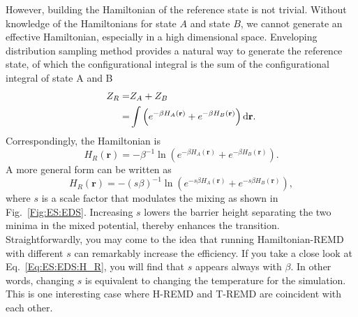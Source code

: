 However, building the Hamiltonian of the reference state is not trivial. Without knowledge of the Hamiltonians for state $A$ and state $B$, we cannot generate an effective Hamiltonian,
especially in a high dimensional space. Enveloping distribution sampling method provides a natural way to generate the reference state, of which the configurational integral is the sum of the configurational integral of state A and B
\begin{align}
	Z_R=&Z_A+Z_B\notag\\
	   =&\int \left(e^{-\beta H_A(\mathbf{r})}+e^{-\beta H_B(\mathbf{r})}\right) \mathop{}\!\mathrm{d} \mathbf{r}.
\end{align}
Correspondingly, the Hamiltonian is
\begin{equation}
	H_R(\mathbf{r})=-\beta^{-1}\ln{\left(e^{-\beta H_A(\mathbf{r})}+e^{-\beta H_B(\mathbf{r})}\right)}.
\end{equation}
A more general form can be written as
\begin{equation}
	H_R(\mathbf{r})=-\left(s\beta\right)^{-1}\ln{\left(e^{-s\beta H_A(\mathbf{r})}+e^{-s\beta H_B(\mathbf{r})}\right)},
	\label{Eq:ES:EDS:H_R}
\end{equation}
where $s$ is a scale factor that modulates the mixing\cite{ChristJCTC2009} as shown in Fig.~\ref{Fig:ES:EDS}. Increasing $s$ lowers the barrier height separating the two minima in the mixed potential, thereby enhances the transition. Straightforwardly, you may come to the idea that running Hamiltonian-REMD with different $s$ can remarkably increase the efficiency.
If you take a close look at Eq.~\ref{Eq:ES:EDS:H_R}, you will find that $s$ appears always with $\beta$. In other words, changing $s$ is equivalent to changing the temperature for the simulation. This is one interesting case where H-REMD and T-REMD are coincident with each other. 
